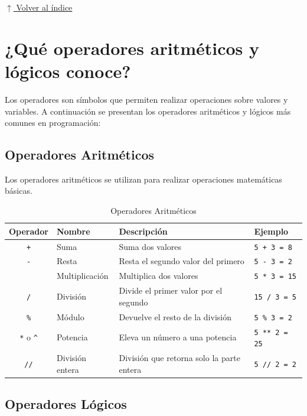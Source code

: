 \documentclass[12pt]{article}
\newcommand{\codigo}[1]{\texttt{\small #1}}
\newcommand{\volverindice}{%
    \vspace{1em}%
    \begin{flushright}%
        \hyperlink{indice}{\small $\uparrow$ Volver al índice}%
    \end{flushright}%
}
\begin{document}
\volverindice
\newpage


\section{¿Qué operadores aritméticos y lógicos conoce?}

Los operadores son símbolos que permiten realizar operaciones sobre valores y variables. A continuación se presentan los operadores aritméticos y lógicos más comunes en programación:

\subsection{Operadores Aritméticos}

Los operadores aritméticos se utilizan para realizar operaciones matemáticas básicas.

\begin{table}[H]
    \centering
    \caption{Operadores Aritméticos}
    \label{tab:operadores_aritmeticos}
    \small
    \begin{tabular}{clp{5cm}l}
        \toprule
        \textbf{Operador} & \textbf{Nombre} & \textbf{Descripción} & \textbf{Ejemplo} \\
        \midrule
        \codigo{+} & Suma & Suma dos valores & \codigo{5 + 3 = 8} \\
        \codigo{-} & Resta & Resta el segundo valor del primero & \codigo{5 - 3 = 2} \\
        \codigo{*} & Multiplicación & Multiplica dos valores & \codigo{5 * 3 = 15} \\
        \codigo{/} & División & Divide el primer valor por el segundo & \codigo{15 / 3 = 5} \\
        \codigo{\%} & Módulo & Devuelve el resto de la división & \codigo{5 \% 3 = 2} \\
        \codigo{**} o \codigo{\^{}} & Potencia & Eleva un número a una potencia & \codigo{5 ** 2 = 25} \\
        \codigo{//} & División entera & División que retorna solo la parte entera & \codigo{5 // 2 = 2} \\
        \bottomrule
    \end{tabular}
\end{table}

\subsection{Operadores Lógicos}
\end{document}
